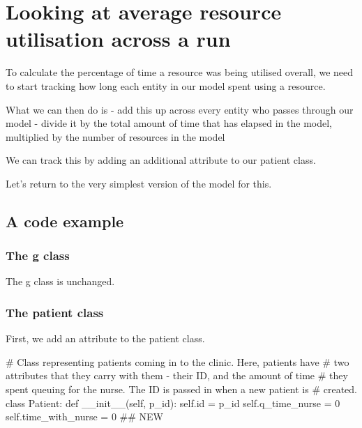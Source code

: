 \documentclass[
  letterpaper,
  DIV=11,
  numbers=noendperiod]{scrreprt}
\newenvironment{Shaded}{}{}
\newcommand{\BuiltInTok}[1]{\textcolor[rgb]{0.84,0.23,0.29}{#1}}
\newcommand{\CommentTok}[1]{\textcolor[rgb]{0.42,0.45,0.49}{#1}}
\newcommand{\DecValTok}[1]{\textcolor[rgb]{0.00,0.36,0.77}{#1}}
\newcommand{\FunctionTok}[1]{\textcolor[rgb]{0.44,0.26,0.76}{#1}}
\newcommand{\KeywordTok}[1]{\textcolor[rgb]{0.84,0.23,0.29}{#1}}
\newcommand{\NormalTok}[1]{\textcolor[rgb]{0.14,0.16,0.18}{#1}}
\newcommand{\OperatorTok}[1]{\textcolor[rgb]{0.14,0.16,0.18}{#1}}
\newcommand{\VariableTok}[1]{\textcolor[rgb]{0.89,0.38,0.04}{#1}}
\begin{document}
\section{Looking at average resource utilisation across a
run}\label{looking-at-average-resource-utilisation-across-a-run}

To calculate the percentage of time a resource was being utilised
overall, we need to start tracking how long each entity in our model
spent using a resource.

What we can then do is - add this up across every entity who passes
through our model - divide it by the total amount of time that has
elapsed in the model, multiplied by the number of resources in the model

We can track this by adding an additional attribute to our patient
class.

Let's return to the very simplest version of the model for this.

\subsection{A code example}\label{a-code-example}

\subsubsection{The g class}\label{the-g-class-7}

The g class is unchanged.

\subsubsection{The patient class}\label{the-patient-class-7}

First, we add an attribute to the patient class.

\begin{Shaded}
\begin{Highlighting}[]
\CommentTok{\# Class representing patients coming in to the clinic.  Here, patients have}
\CommentTok{\# two attributes that they carry with them {-} their ID, and the amount of time}
\CommentTok{\# they spent queuing for the nurse.  The ID is passed in when a new patient is}
\CommentTok{\# created.}
\KeywordTok{class}\NormalTok{ Patient:}
    \KeywordTok{def} \FunctionTok{\_\_init\_\_}\NormalTok{(}\VariableTok{self}\NormalTok{, p\_id):}
        \VariableTok{self}\NormalTok{.}\BuiltInTok{id} \OperatorTok{=}\NormalTok{ p\_id}
        \VariableTok{self}\NormalTok{.q\_time\_nurse }\OperatorTok{=} \DecValTok{0}
        \VariableTok{self}\NormalTok{.time\_with\_nurse }\OperatorTok{=} \DecValTok{0} \CommentTok{\#\# NEW}
\end{Highlighting}
\end{Shaded}
\end{document}
